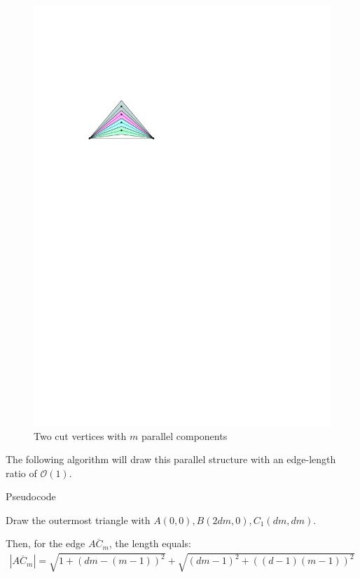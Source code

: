 \begin{figure}[H]
	\centering
	\includegraphics[width=.7\linewidth,page=2]{drawings/2-trees.pdf}
	\caption{Two cut vertices with $m$ parallel components}
\end{figure}
The following algorithm will draw this parallel structure with an edge-length ratio of $\mathcal{O}(1)$.\\
\begin{algorithm}[H]
	\caption{Pseudocode}
	Draw the outermost triangle with $A(0,0), B(2dm,0), C_1(dm,dm)$.\\
\end{algorithm}
Then, for the edge $\overline{AC_m}$, the length equals:
\begin{align*}
	|\overline{AC_m}| = \sqrt{1+\left(dm-(m-1)\right)^2} + \sqrt{\left(dm-1\right)^2 + \left((d-1)(m-1)  \right)^2}
\end{align*}
